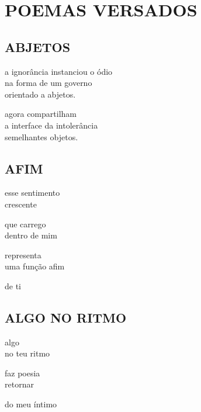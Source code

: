 \chapter{POEMAS VERSADOS}

\section{ABJETOS}

a ignorância instanciou o ódio\\
na forma de um governo\\
orientado a abjetos.\\

\vspace{0.1cm}

agora compartilham\\
a interface da intolerância\\
semelhantes objetos.

\section{AFIM}

esse sentimento\\
crescente\\

\vspace{0.1cm}

que carrego\\
dentro de mim\\

\vspace{0.1cm}

representa\\
uma função afim\\

\vspace{0.1cm}

de ti

\section{ALGO NO RITMO}

algo\\
no teu ritmo\\

\vspace{0.1cm}

faz poesia\\
retornar\\

\vspace{0.1cm}

do meu íntimo